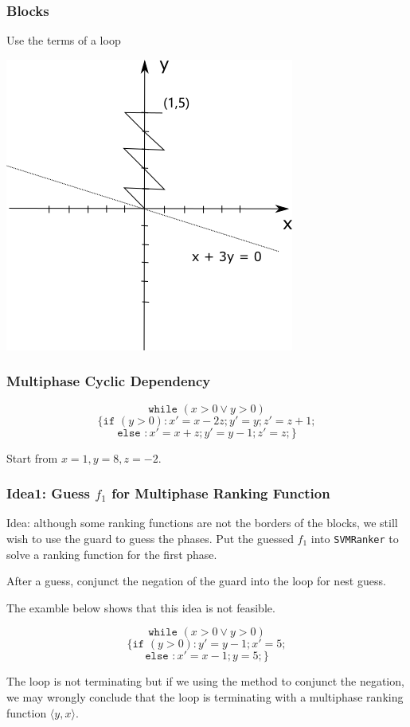 \documentclass[11pt]{beamer}
\begin{document}
\begin{frame}\frametitle{Blocks}
Use the terms of a loop 
\begin{center}

\includegraphics[scale = 0.45]{jump.png}

\end{center}
\end{frame}

\begin{frame}\frametitle{Multiphase Cyclic Dependency}
\begin{example}

\[\texttt{while }(x > 0 \vee y > 0) \]
\[\{\texttt{if }(y > 0): x' = x - 2z; y' = y; z' = z + 1;\]
\[\texttt{else }: x' = x + z; y' = y - 1; z' = z;\}\]
\end{example}

Start from $x = 1, y = 8, z = -2$.



\end{frame}



\begin{frame}\frametitle{Idea1: Guess $f_1$ for Multiphase Ranking Function}
Idea: although some ranking functions are not the borders of the blocks, we still wish to use the guard to guess the phases. Put the guessed $f_1$ into \texttt{SVMRanker} to solve a ranking function for the first phase.

After a guess, conjunct the negation of the guard into the loop for nest guess.

The examble below shows that this idea is not feasible.
\begin{example}

\[\texttt{while }(x > 0 \vee y > 0) \]
\[\{\texttt{if }(y > 0): y' = y - 1; x' = 5;\]
\[\texttt{else }: x' = x - 1; y = 5; \}\]

\end{example}
The loop is not terminating but if we using the method to conjunct the negation, we may wrongly conclude that the loop is terminating with a multiphase ranking function $\langle y, x\rangle$.
\end{frame}
\end{document}
